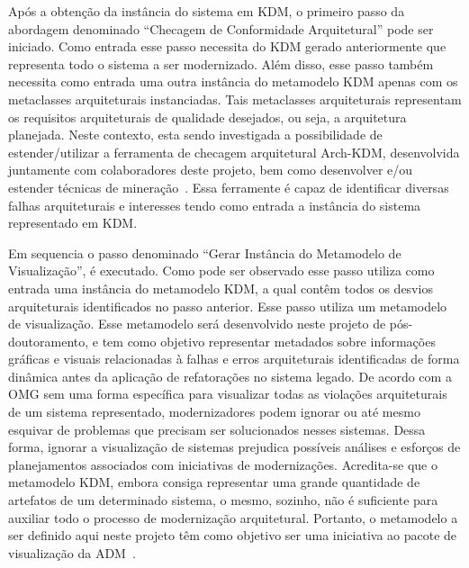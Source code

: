 \documentclass[12pt]{article}
\begin{document}
Após a obtenção da instância do sistema em KDM, o primeiro passo da abordagem denominado ``Checagem de Conformidade Arquitetural'' pode ser iniciado. Como entrada esse passo necessita do KDM gerado anteriormente que representa todo o sistema a ser modernizado. Além disso, esse passo também necessita como entrada uma outra instância do metamodelo KDM apenas com os metaclasses arquiteturais instanciadas. Tais metaclasses arquiteturais representam os requisitos arquiteturais de qualidade desejados, ou seja, a arquitetura planejada. Neste contexto, esta sendo investigada a possibilidade de estender/utilizar a ferramenta de checagem arquitetural Arch-KDM, desenvolvida juntamente com colaboradores deste projeto, bem como desenvolver e/ou estender técnicas de mineração~\cite{source_miner_glauco, daniel_san_journal}. Essa ferramente é capaz de identificar diversas falhas arquiteturais e interesses tendo como entrada a instância do sistema representado em KDM.

Em sequencia o passo denominado ``Gerar Instância do Metamodelo de Visualização'', é executado. Como pode ser observado esse passo utiliza como entrada uma instância do metamodelo KDM, a qual contêm todos os desvios arquiteturais identificados no passo anterior. Esse passo utiliza um metamodelo de visualização. Esse metamodelo será desenvolvido neste projeto de pós-doutoramento, e tem como objetivo representar metadados sobre informações gráficas e visuais relacionadas à falhas e erros arquiteturais identificadas de forma dinâmica antes da aplicação de refatorações no sistema legado. De acordo com a OMG sem uma forma específica para visualizar todas as violações arquiteturais de um sistema representado, modernizadores podem ignorar ou até mesmo esquivar de problemas que precisam ser solucionados nesses sistemas. Dessa forma, ignorar a visualização de sistemas prejudica possíveis análises e esforços de planejamentos associados com iniciativas de modernizações. Acredita-se que o metamodelo KDM, embora consiga representar uma grande quantidade de artefatos de um determinado sistema, o mesmo, sozinho, não é suficiente para auxiliar todo o processo de modernização arquitetural. Portanto, o metamodelo a ser definido aqui neste projeto têm como objetivo ser uma iniciativa ao pacote de visualização da ADM~\cite{ADM:visualization}.
\end{document}
